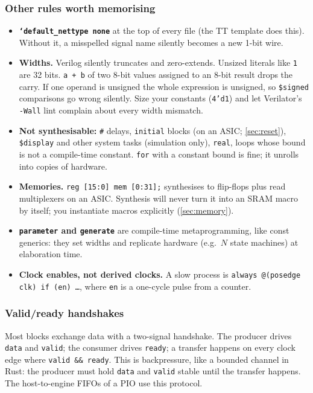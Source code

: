 \subsubsection{Other rules worth memorising}
\begin{itemize}
  \item \textbf{\texttt{`default\_nettype none}} at the top of every file
    (the TT template does this). Without it, a misspelled signal name
    silently becomes a new 1-bit wire.
  \item \textbf{Widths.} Verilog silently truncates and zero-extends.
    Unsized literals like \texttt{1} are 32 bits. \texttt{a + b} of two 8-bit
    values assigned to an 8-bit result drops the carry. If one operand is
    unsigned the whole expression is unsigned, so \texttt{\$signed}
    comparisons go wrong silently. Size your constants (\texttt{4'd1}) and
    let Verilator's \texttt{-Wall} lint complain about every width mismatch.
  \item \textbf{Not synthesisable:} \texttt{\#} delays, \texttt{initial}
    blocks (on an ASIC; \cref{sec:reset}), \texttt{\$display} and other
    system tasks (simulation only), \texttt{real}, loops whose bound is not
    a compile-time constant. \texttt{for} with a constant bound is fine; it
    unrolls into copies of hardware.
  \item \textbf{Memories.} \texttt{reg [15:0] mem [0:31];} synthesises to
    flip-flops plus read multiplexers on an ASIC. Synthesis will never turn
    it into an SRAM macro by itself; you instantiate macros explicitly
    (\cref{sec:memory}).
  \item \textbf{\texttt{parameter} and \texttt{generate}} are compile-time
    metaprogramming, like const generics: they set widths and replicate
    hardware (e.g.\ $N$ state machines) at elaboration time.
  \item \textbf{Clock enables, not derived clocks.} A slow process is
    \texttt{always @(posedge clk) if (en) \ldots}, where \texttt{en} is a
    one-cycle pulse from a counter.
\end{itemize}

\subsubsection{Valid/ready handshakes}

Most blocks exchange data with a two-signal handshake. The producer drives
\texttt{data} and \texttt{valid}; the consumer drives \texttt{ready}; a
transfer happens on every clock edge where \texttt{valid \&\& ready}. This is
backpressure, like a bounded channel in Rust: the producer must hold
\texttt{data} and \texttt{valid} stable until the transfer happens. The
host-to-engine FIFOs of a PIO use this protocol.

